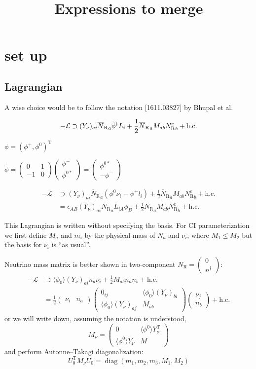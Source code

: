 \documentclass[english,11pt,a4paper]{article}
\title{Expressions to merge}
\numberwithin{equation}{section}  %
\newcommand\w[1]{_{\mathrm{#1}}}
\newcommand\pmat[1]{\begin{pmatrix}#1\end{pmatrix}} %
\newcommand\vev[1]{\langle#1\rangle}
\newcommand\YN{Y_\nu}
\newcommand\NR{{N\w R}}
\newcommand\NRbar{{\overline N\w R}}
\newcommand\NRc{{N\w R^{\mathrm c}}}
\newcommand{\trans}{^{\mathrm T}}
\newcommand{\spmat}[1]{\left(\begin{smallmatrix}#1\end{smallmatrix}\right)}
\DeclareMathOperator{\diag}{\mathrm{diag}}
\begin{document}
\section{set up}
\subsection{Lagrangian}
A wise choice would be to follow the notation [1611.03827] by Bhupal et al.

\begin{equation}
 -\mathcal L \supset (\YN)_{ai} \NRbar_a \tilde\phi^\dagger L_i + \frac12 \NRbar_a M_{ab} \NRc_b + \text{h.c.}
\\
\end{equation}

$\phi = (\phi^+, \phi^0)\trans$

$\tilde\phi = \spmat{0&1\\-1&0}\spmat{\phi^-\\\phi^{0*}} = \spmat{\phi^{0*}\\-\phi^-}$

\begin{align}
  -\mathcal L &\supset (\YN)_{ai} \NRbar_a (\phi^{0}\nu_i-\phi^+l_i) + \frac12 \NRbar_a M_{ab} \NRc_b + \text{h.c.}\\
   &= \epsilon_{AB}(\YN)_{ai} \NRbar_a L_{iA}\phi_B + \frac12 \NRbar_a M_{ab} \NRc_b + \text{h.c.}
\end{align}

This Lagrangian is written without specifying the basis.
For CI parameterization we first define $M_a$ and $m_i$ by the physical mass of $N_a$ and $\nu_i$, where $M_1\le M_2$ but the basis for $\nu_i$ is ``as usual''.


Neutrino mass matrix is better shown in two-component $\NR=\spmat{0\\n^\dagger}$:
\begin{align}
  -\mathcal L &
\supset \vev{\phi_0}(\YN)_{ai} n_a\nu_i + \frac12 M_{ab}n_an_b + \text{h.c.}\\
&=
\frac12\pmat{\nu_i & n_a}
\pmat{
 0_{ij} & \vev{\phi_0}(\YN)_{bi} \\
 \vev{\phi_0}(\YN)_{aj} & M_{ab}
}
\pmat{\nu_j \\ n_b} + \text{h.c.}
\end{align}
or we will write down, assuming the notation is understood,
\begin{equation}
 M_\nu = \pmat{
   0 & \vev{\phi^0}\YN\trans\\
   \vev{\phi^0}\YN & M
}
\end{equation}
and perform Autonne--Takagi diagonalization:
\begin{equation}
 U_0\trans M_\nu U_0 = \diag(m_1, m_2, m_3, M_1, M_2)
\end{equation}
\end{document}
